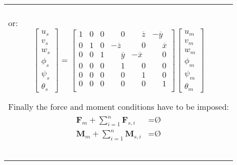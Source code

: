 \documentclass[10pt,b5paper,titlepage]{book}
\newcommand{\m}{\mathbf}
\newcommand{\Null}{\text{\O}}
\newenvironment{bbox}[1][0.96]
{
    \begin{center}
        \begin{tabular}{|p{#1\textwidth}|}
            \hline\\
}
{
            \\\\\hline
        \end{tabular}
    \end{center}
}
\newenvironment{eqarray}
{
    \begin{eqnarray}
        \begin{aligned}
}
{
        \end{aligned}
    \end{eqnarray}
}
\begin{document}
\begin{bbox}[0.95]
    or:
    \begin{equation}
        \begin{bmatrix}
            u_s \\
            v_s \\
            w_s \\
            \phi_s \\
            \psi_s \\
            \theta_s
        \end{bmatrix}
        = \begin{bmatrix}
            1 & 0 & 0 & \phantom{-}0 & \phantom{-}\overline{z} & -\overline{y} \\
            0 & 1 & 0 & -\overline{z} & \phantom{-}0 & \phantom{-}\overline{x} \\
            0 & 0 & 1 & \phantom{-}\overline{y} & -\overline{x} & \phantom{-}0 \\
            0 & 0 & 0 & \phantom{-}1 & \phantom{-}0 & \phantom{-}0 \\
            0 & 0 & 0 & \phantom{-}0 & \phantom{-}1 & \phantom{-}0 \\
            0 & 0 & 0 & \phantom{-}0 & \phantom{-}0 & \phantom{-}1 \\
        \end{bmatrix}
        \begin{bmatrix}
            u_m \\
            v_m \\
            w_m \\
            \phi_m \\
            \psi_m \\
            \theta_m
        \end{bmatrix}
    \end{equation}

    Finally the force and moment conditions have to be imposed:
    \begin{eqarray}
        \m{F}_m + \sum_{i=1}^n \m{F}_{s,i} &= \Null \\
        \m{M}_m + \sum_{i=1}^n \m{M}_{s,i} &= \Null \\
    \end{eqarray}


\end{bbox}
\end{document}
